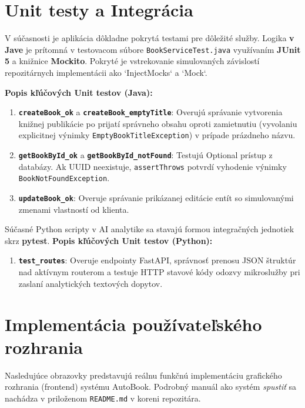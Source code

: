 \documentclass[12pt,a4paper]{article}
\begin{document}
\section{Unit testy a Integrácia}

V súčasnosti je aplikácia dôkladne pokrytá testami pre dôležité služby. Logika \textbf{v Jave} je prítomná v testovacom súbore \texttt{BookServiceTest.java} využívaním \textbf{JUnit 5} a knižnice \textbf{Mockito}. Pokryté je vstrekovanie simulovaných závislostí repozitárnych implementácii ako `InjectMocks` a `Mock`. 

\textbf{Popis kľúčových Unit testov (Java):}
\begin{enumerate}
    \item \textbf{\texttt{createBook\_ok}} a \textbf{\texttt{createBook\_emptyTitle}}: Overujú správanie vytvorenia knižnej publikácie po prijatí správneho obsahu oproti zamietnutiu (vyvolaniu explicitnej výnimky \texttt{EmptyBookTitleException}) v prípade prázdneho názvu. 
    \item \textbf{\texttt{getBookById\_ok}} a \textbf{\texttt{getBookById\_notFound}}: Testujú Optional prístup z databázy. Ak UUID neexistuje, \texttt{assertThrows} potvrdí vyhodenie výnimky \texttt{BookNotFoundException}.
    \item \textbf{\texttt{updateBook\_ok}}: Overuje správanie prikázanej editácie entít so simulovanými zmenami vlastností od klienta.
\end{enumerate}

Súčasné Python scripty v AI analytike sa stavajú formou integračných jednotiek skrz \textbf{pytest}.
\textbf{Popis kľúčových Unit testov (Python):}
\begin{enumerate}
    \item \textbf{\texttt{test\_routes}}: Overuje endpointy FastAPI, správnosť prenosu JSON štruktúr nad aktívnym routerom a testuje HTTP stavové kódy odozvy mikroslužby pri zaslaní analytických textových dopytov.
\end{enumerate}

\section{Implementácia používateľského rozhrania}

Nasledujúce obrazovky predstavujú reálnu funkčnú implementáciu grafického rozhrania (frontend) systému AutoBook. Podrobný manuál ako systém \textit{spustiť} sa nachádza v priloženom \texttt{README.md} v koreni repozitára.
\end{document}
